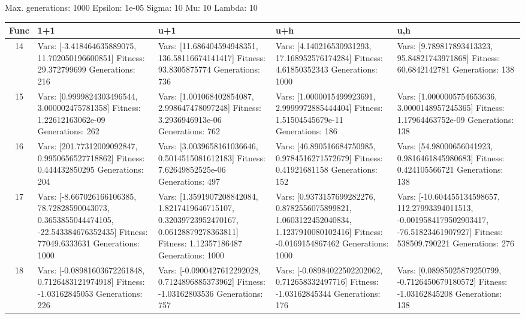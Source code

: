 \documentclass[landscape,11pt]{article}
\begin{document}
\newpage
Max. generations: 1000 Epsilon: 1e-05 Sigma: 10 Mu: 10 Lambda: 10 \\
\begin{tabular}{|c|p{5.4cm}|p{5.4cm}|p{5.4cm}|p{5.4cm}|}
\hline
Func & 1+1 & u+1 & u+h & u,h \\ 
\hline 14 & Vars: [-3.418464635889075, 11.702050196600851] Fitness: 29.372799699 Generations: 216 & Vars: [11.686404594948351, 136.58116674141417] Fitness: 93.8305875774 Generations: 736 & Vars: [4.140216530931293, 17.168952576174284] Fitness: 4.61850352343 Generations: 1000 & Vars: [9.789817893413323, 95.84821743971868] Fitness: 60.6842142781 Generations: 138 \\
 \hline 
 15 & Vars: [0.9999824303496544, 3.000002475781358] Fitness: 1.22612163062e-09 Generations: 262 & Vars: [1.001068402854087, 2.998647478097248] Fitness: 3.2936946913e-06 Generations: 762 & Vars: [1.0000015499923691, 2.9999972885444404] Fitness: 1.51504545679e-11 Generations: 186 & Vars: [1.0000005754653636, 3.0000148957245365] Fitness: 1.17964463752e-09 Generations: 138 \\
 \hline 
 16 & Vars: [201.77312009092847, 0.9950656527718862] Fitness: 0.444432850295 Generations: 204 & Vars: [3.0039658161036646, 0.5014515081612183] Fitness: 7.62649852525e-06 Generations: 497 & Vars: [46.890516684750985, 0.9784516271572679] Fitness: 0.41921681158 Generations: 152 & Vars: [54.98000656041923, 0.9816461845980683] Fitness: 0.424105566721 Generations: 138 \\
 \hline 
 17 & Vars: [-8.667026166106385, 78.72828590043073, 0.3653855044474105, -22.543384676352435] Fitness: 77049.6333631 Generations: 1000 & Vars: [1.3591907208842084, 1.8217419646715107, 0.32039723952470167, 0.06128879278363811] Fitness: 1.12357186487 Generations: 1000 & Vars: [0.9373157699282276, 0.8782556075899821, 1.0603122452040834, 1.1237910080102416] Fitness: -0.0169154867462 Generations: 1000 & Vars: [-10.604455134598657, 112.27993394011513, -0.0019584179502903417, -76.51823461907927] Fitness: 538509.790221 Generations: 276 \\
 \hline 
 18 & Vars: [-0.08981603672261848, 0.7126483121974918] Fitness: -1.03162845053 Generations: 226 & Vars: [-0.0900427612292028, 0.7124896885373962] Fitness: -1.03162803536 Generations: 757 & Vars: [-0.08984022502202062, 0.712658332497716] Fitness: -1.03162845344 Generations: 176 & Vars: [0.08985025879250799, -0.7126450679180572] Fitness: -1.03162845208 Generations: 138 \\
 \hline 
\end{tabular}
\end{document}
